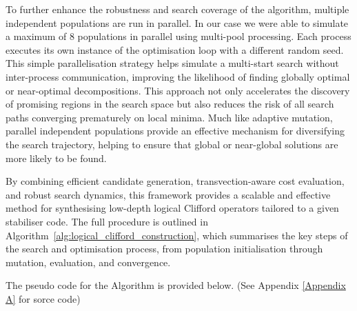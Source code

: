 To further enhance the robustness and search coverage of the algorithm, multiple independent populations are run in parallel. In our case we were able to simulate a maximum of 8 populations in parallel using multi-pool processing. Each process executes its own instance of the optimisation loop with a different random seed. This simple parallelisation strategy helps simulate a multi-start search without inter-process communication, improving the likelihood of finding globally optimal or near-optimal decompositions. This approach not only accelerates the discovery of promising regions in the search space but also reduces the risk of all search paths converging prematurely on local minima. Much like adaptive mutation, parallel independent populations provide an effective mechanism for diversifying the search trajectory, helping to ensure that global or near-global solutions are more likely to be found.

By combining efficient candidate generation, transvection-aware cost evaluation, and robust search dynamics, this framework provides a scalable and effective method for synthesising low-depth logical Clifford operators tailored to a given stabiliser code. The full procedure is outlined in Algorithm~\ref{alg:logical_clifford_construction}, which summarises the key steps of the search and optimisation process, from population initialisation through mutation, evaluation, and convergence. 

The pseudo code for the Algorithm is provided below. (See Appendix \ref{Appendix A} for sorce code)

